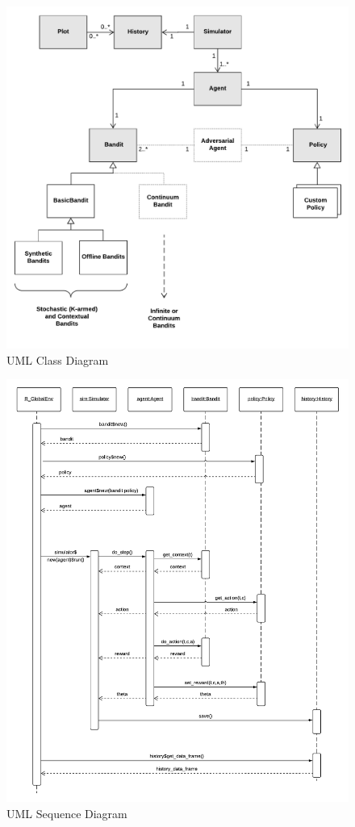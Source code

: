 \documentclass{jss}
\begin{document}
\begin{figure}[H]
  \centering
    \includegraphics[width=.99\textwidth]{fig/contextual_class}

      \caption{ UML Class Diagram}
          \label{fig:contextual_class}
\end{figure}

\begin{figure}[H]
  \centering
    \includegraphics[width=.99\textwidth]{fig/contextual_sequence}

      \caption{ UML Sequence Diagram}
      \label{fig:contextual_sequence}
\end{figure}
\end{document}
